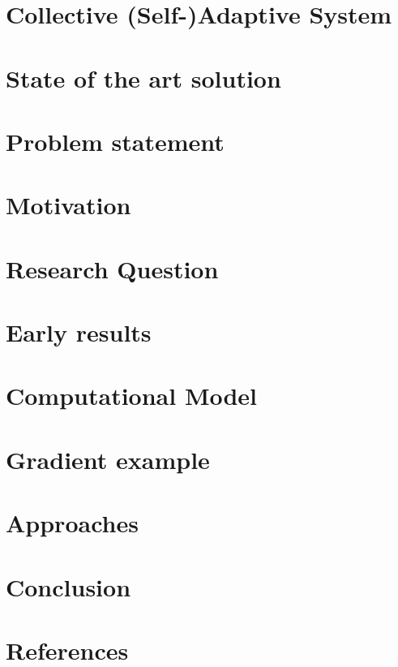 

\section{Collective (Self-)Adaptive System}


\section{State of the art solution}



\section{Problem statement}


\section{Motivation}


\section{Research Question}


\section{Early results}


\section{Computational Model}



\section{Gradient example}



\section{Approaches}





\section{Conclusion}


\section{References}
